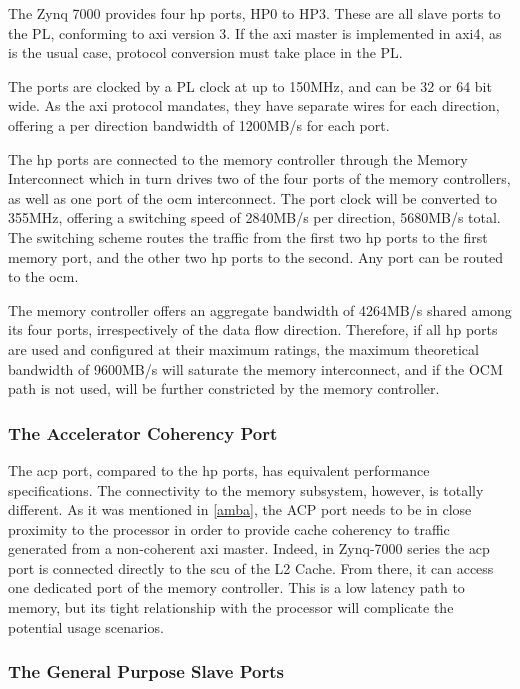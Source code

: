 The Zynq 7000 provides four \gls{hp} ports, HP0 to HP3.
These are all slave ports to the PL, conforming to \gls{axi} version 3.
If the \gls{axi} master is implemented in \gls{axi}4, as is the usual case,
protocol conversion must take place in the PL.

The ports are clocked by a PL clock at up to 150MHz, and can be 32 or 64 bit wide.
As the \gls{axi} protocol mandates, they have separate wires for each direction,
offering a per direction bandwidth of 1200MB/s for each port.

The \gls{hp} ports are connected to the memory controller through the Memory Interconnect
which in turn drives two of the four ports of the memory controllers, as well as
one port of the \gls{ocm} interconnect.
The port clock will be converted to 355MHz,
offering a switching speed of 2840MB/s per direction, 5680MB/s total.
The switching scheme routes the traffic from the first two \gls{hp} ports 
to the first memory port, and the other two \gls{hp} ports to the second. 
Any port can be routed to the \gls{ocm}.

The memory controller offers an aggregate bandwidth of 4264MB/s 
shared among its four ports, irrespectively of the data flow direction.
Therefore, if all \gls{hp} ports are used and configured at their maximum ratings,
the maximum theoretical bandwidth of 9600MB/s will saturate the
memory interconnect, and if the OCM path is not used, will be further constricted
by the memory controller.

\subsubsection{The Accelerator Coherency Port}

The \gls{acp} port, compared to the \gls{hp} ports, 
has equivalent performance specifications.
The connectivity to the memory subsystem, 
however, is totally different.
As it was mentioned in \ref{amba}, 
the ACP port needs to be in close proximity to the
processor in order to provide cache coherency 
to traffic generated from a non-coherent \gls{axi} master.
Indeed, in Zynq-7000 series the \gls{acp} port is connected 
directly to the \gls{scu} of the L2 Cache. 
From there, it can access one dedicated 
port of the memory controller.
This is a low latency path to memory, 
but its tight relationship with the processor
will complicate the potential usage scenarios.

\subsubsection{The General Purpose Slave Ports}
\label{sect:sgp}

